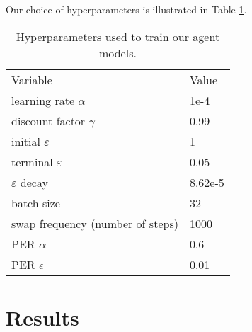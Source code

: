 Our choice of hyperparameters is illustrated in Table \ref{tab:our-hyperparameters}.

\begin{table}
    \centering
        \begin{tabular}{ll}
        Variable                           & Value   \\
        learning rate $\alpha$             & 1e-4    \\
        discount factor $\gamma$           & 0.99    \\
        initial $\varepsilon$              & 1       \\
        terminal $\varepsilon$             & 0.05    \\
        $\varepsilon$ decay                & 8.62e-5 \\
        batch size                         & 32      \\
        swap frequency (number of steps)   & 1000    \\
        PER $\alpha$                       & 0.6     \\
        PER $\epsilon$                     & 0.01
        \end{tabular}%
    \caption{Hyperparameters used to train our agent models.}
    \label{tab:our-hyperparameters}
    \end{table}


\section*{Results}
